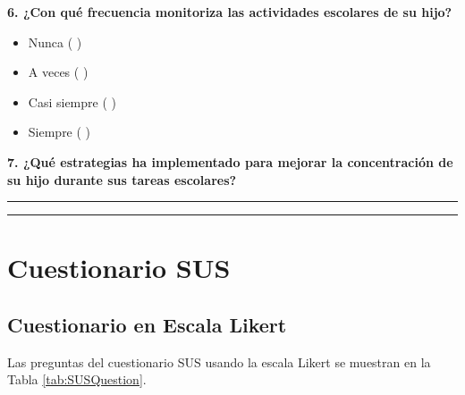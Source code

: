 \documentclass[a4paper,fleqn]{cas-sc}
\begin{document}
	\noindent
	\textbf{6. ¿Con qué frecuencia monitoriza las actividades escolares de su hijo?}
	
	\begin{itemize}
		\item Nunca ( )
		\item A veces ( )
		\item Casi siempre ( )
		\item Siempre ( )
	\end{itemize}
	
	\noindent
	\textbf{7. ¿Qué estrategias ha implementado para mejorar la concentración de su hijo durante sus tareas escolares?}
	
	\vspace{12pt}
	\noindent
	\rule{\textwidth}{1pt}
	
	\vspace{12pt}
	\noindent
	\rule{\textwidth}{1pt}
	
	\clearpage
	\section[\appendixname~\thesection]{Cuestionario SUS}
	\label{Appendix:SUSQuestionarie}
	
	
	\subsection[\appendixname~\thesection]{Cuestionario en Escala Likert}
	\label{Appendix:LikertScale}
	Las preguntas del cuestionario SUS usando la escala Likert se muestran en la Tabla \ref{tab:SUSQuestion}.
	
\end{document}
